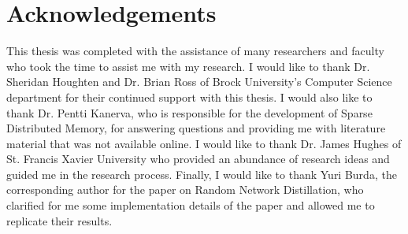 \documentclass[journal, onecolumn, 12pt, draftclsnofoot]{IEEEtran}
\begin{document}
	\section*{Acknowledgements}
	\par This thesis was completed with the assistance of many researchers and faculty who took the time to assist me with my research. I would like to thank Dr. Sheridan Houghten and Dr. Brian Ross of Brock University's Computer Science department for their continued support with this thesis. I would also like to thank Dr. Pentti Kanerva, who is responsible for the development of Sparse Distributed Memory, for answering questions and providing me with literature material that was not available online. I would like to thank Dr. James Hughes of St. Francis Xavier University who provided an abundance of research ideas and guided me in the research process. Finally, I would like to thank Yuri Burda, the corresponding author for the paper on Random Network Distillation, who clarified for me some implementation details of the paper and allowed me to replicate their results.
	\newpage

	\tableofcontents

	\newpage
\end{document}
